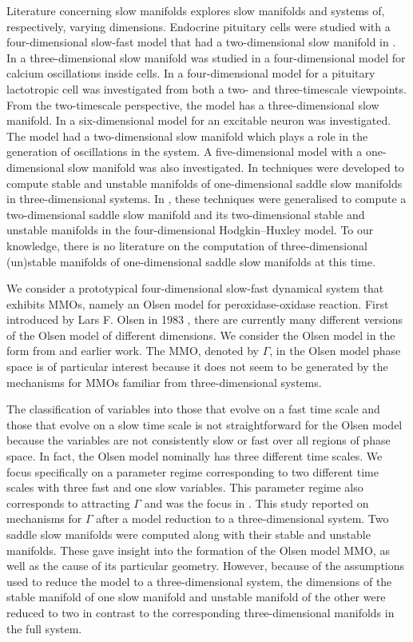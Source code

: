 \documentclass{ws-ijbc}
\begin{document}
Literature concerning slow manifolds explores slow manifolds and systems of, respectively, varying dimensions. Endocrine pituitary cells were studied with a four-dimensional slow-fast model that had a two-dimensional slow manifold in \cite{Vo_paper2}.  In \cite{Emily_Harvey_paper} a three-dimensional slow manifold was studied in a four-dimensional model for calcium oscillations inside cells. In \cite{Vo_paper} a four-dimensional model for a pituitary lactotropic cell was investigated from both a two- and three-timescale viewpoints.  From the two-timescale perspective, the model has a three-dimensional slow manifold.  In \cite{Martin_neuron_paper} a six-dimensional model for an excitable neuron was investigated.  The model had a two-dimensional slow manifold which plays a role in the generation of oscillations in the system.  A five-dimensional model with a one-dimensional slow manifold was also investigated.  In \cite{Saeed_Paper} techniques were developed to compute stable and unstable manifolds of one-dimensional saddle slow manifolds in three-dimensional systems. In \cite{Cris_paper}, these techniques were generalised to compute a two-dimensional saddle slow manifold and its two-dimensional stable and unstable manifolds in the four-dimensional Hodgkin--Huxley model.  To our knowledge, there is no literature on the computation of three-dimensional (un)stable manifolds of one-dimensional saddle slow manifolds at this time.

We consider a prototypical four-dimensional slow-fast dynamical system that exhibits MMOs, namely an Olsen model for peroxidase-oxidase reaction.  First introduced by Lars F. Olsen in 1983  \cite{Olsen}, there are currently many different versions of the Olsen model of different dimensions.  We consider the Olsen model in the form from \cite{Rescaling} and earlier work.  The MMO, denoted by $\Gamma$, in the Olsen model phase space is of particular interest because it does not seem to be generated by the mechanisms for MMOs familiar from three-dimensional systems.

The classification of variables into those that evolve on a fast time scale and those that evolve on a slow time scale is not straightforward for the Olsen model because the variables are not consistently slow or fast over all regions of phase space.  In fact, the Olsen model nominally has three different time scales.  We focus specifically on a parameter regime corresponding to two different time scales with three fast and one slow variables.  This parameter regime also corresponds to attracting $\Gamma$ and was the focus in \cite{QSSA}.  This study reported on mechanisms for $\Gamma$ after a model reduction to a three-dimensional system.  Two saddle slow manifolds were computed along with their stable and unstable manifolds.  These gave insight into the formation of the Olsen model MMO, as well as the cause of its particular geometry.  However, because of the assumptions used to reduce the model to a three-dimensional system, the dimensions of the stable manifold of one slow manifold and unstable manifold of the other were reduced to two in contrast to the corresponding three-dimensional manifolds in the full system.  
\end{document}
